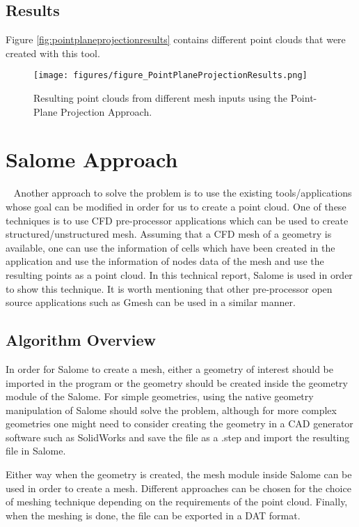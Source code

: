 \documentclass[12pt]{article}
\begin{document}
\subsection{Results}
\label{subsec:results}
Figure \ref{fig:pointplaneprojectionresults} contains different point clouds that were created with this tool. 
\begin{figure}[htp]
\centering
	\texttt{[image: figures/figure\_PointPlaneProjectionResults.png]}
	\caption{Resulting point clouds from different mesh inputs using the Point-Plane Projection Approach.}
	\label{fig: pointplaneprojectionresults}
\end{figure}

\section{Salome Approach}\
\label{sec:salomeapproach}
Another approach to solve the problem is to use the existing tools/applications whose goal can be modified in order for us to create a point cloud. One of these techniques is to use CFD pre-processor applications which can be used to create structured/unstructured mesh. Assuming that a CFD mesh of a geometry is available, one can use the information of cells which have been created in the application and use the information of nodes data of the mesh and use the resulting points as a point cloud. In this technical report, Salome \cite{salome} is used in order to show this technique. It is worth mentioning that other pre-processor open source applications such as Gmesh \cite{gmesh} can be used in a similar manner.
\subsection{Algorithm Overview}
\label{subsec:algorithmoverview}
In order for Salome to create a mesh, either a geometry of interest should be imported in the program or the geometry should be created inside the geometry module of the Salome. For simple geometries, using the native geometry manipulation of Salome should solve the problem, although for more complex geometries one might need to consider creating the geometry in a CAD generator software such as SolidWorks \cite{solidworks} and save the file as a .step and import the resulting file in Salome.

Either way when the geometry is created, the mesh module inside Salome can be used in order to create a mesh. Different approaches can be chosen for the choice of meshing technique depending on the requirements of the point cloud. Finally, when the meshing is done, the file can be exported in a DAT format.
\end{document}
